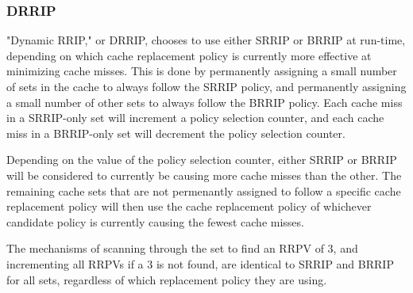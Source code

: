 \subsubsection{DRRIP}

"Dynamic RRIP," or DRRIP, chooses to use either SRRIP or BRRIP at run-time, depending on which cache replacement policy is currently more effective at minimizing cache misses.  This is done by permanently assigning a small number of sets in the cache to always follow the SRRIP policy, and permanently assigning a small number of other sets to always follow the BRRIP policy.  Each cache miss in a SRRIP-only set will increment a policy selection counter, and each cache miss in a BRRIP-only set will decrement the policy selection counter.

Depending on the value of the policy selection counter, either SRRIP or BRRIP will be considered to currently be causing more cache misses than the other.  The remaining cache sets that are not permenantly assigned to follow a specific cache replacement policy will then use the cache replacement policy of whichever candidate policy is currently causing the fewest cache misses.

The mechanisms of scanning through the set to find an RRPV of 3, and incrementing all RRPVs if a 3 is not found, are identical to SRRIP and BRRIP for all sets, regardless of which replacement policy they are using.

